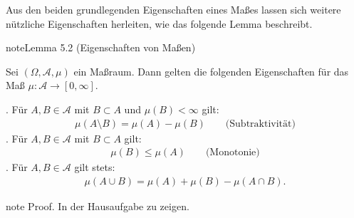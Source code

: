 \documentclass[letterpaper,10pt,english]{jupyterBook}
\begin{document}
\sphinxAtStartPar
Aus den beiden grundlegenden Eigenschaften eines Maßes lassen sich weitere nützliche Eigenschaften herleiten, wie das folgende Lemma beschreibt.
\label{masstheorie/masstheorie:lemma-4}
\begin{sphinxadmonition}{note}{Lemma 5.2 (Eigenschaften von Maßen)}



\sphinxAtStartPar
Sei \((\Omega, \mathcal{A}, \mu)\) ein Maßraum.
Dann gelten die folgenden Eigenschaften für das Maß \(\mu \colon \mathcal{A} \rightarrow [0,\infty]\).

. Für \(A,B \in \mathcal{A}\) mit \(B \subset A\) und \(\mu(B) < \infty\) gilt:
\begin{equation*}
\begin{split}\mu(A \setminus B) = \mu(A) - \mu(B) \qquad \text{(Subtraktivität)}\end{split}
\end{equation*}
. Für \(A,B \in \mathcal{A}\) mit \(B \subset A\) gilt:
\begin{equation*}
\begin{split}\mu(B) \leq \mu(A) \qquad \text{(Monotonie)}\end{split}
\end{equation*}
. Für \(A,B \in \mathcal{A}\) gilt stets:
\begin{equation*}
\begin{split}\mu(A \cup B) = \mu(A) + \mu(B) - \mu(A \cap B).\end{split}
\end{equation*}\end{sphinxadmonition}

\begin{sphinxadmonition}{note}
\sphinxAtStartPar
Proof. In der Hausaufgabe zu zeigen.
\end{sphinxadmonition}
\end{document}
